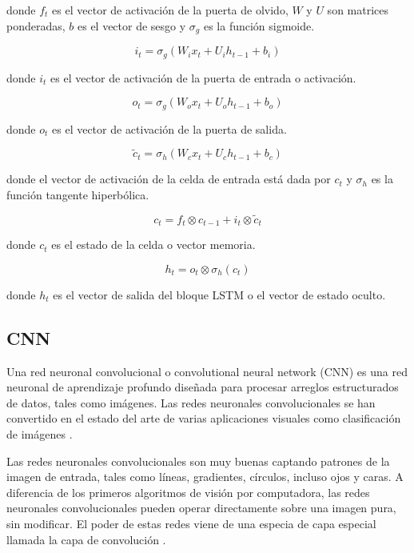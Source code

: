 donde $f_t$ es el vector de activación de la puerta de olvido, $W$ y $U$ son matrices ponderadas, $b$ es el vector de sesgo y $\sigma_{g}$ es la función sigmoide. 

\begin{equation}
	i_{t}=\sigma_{g}\left(W_{i} x_{t}+U_{i} h_{t-1}+b_{i}\right)
\end{equation}

donde $i_t$ es el vector de activación de la puerta de entrada o activación.

\begin{equation}
	o_{t}=\sigma_{g}\left(W_{o} x_{t}+U_{o} h_{t-1}+b_{o}\right)
\end{equation}

donde $o_t$ es el vector de activación de la puerta de salida.

\begin{equation}
	\tilde{c}_{t}=\sigma_{h}\left(W_{c} x_{t}+U_{c} h_{t-1}+b_{c}\right)
\end{equation}

donde el vector de activación de la celda de entrada está dada por $c_t$ y $\sigma_{h}$ es la función tangente hiperbólica.

\begin{equation}
	c_{t}=f_{t} \otimes c_{t-1}+i_{t} \otimes \tilde{c}_{t}
\end{equation}

donde $c_t$ es el estado de la celda o vector memoria.

\begin{equation}
	h_{t}=o_{t} \otimes \sigma_{h}\left(c_{t}\right)
	\label{LSTM2}
\end{equation}

donde $h_t$ es el vector de salida del bloque LSTM o el vector de estado oculto. 


\subsection{CNN}
Una red neuronal convolucional o convolutional neural network (CNN) es una red neuronal de aprendizaje profundo diseñada para procesar arreglos estructurados de datos, tales como imágenes. Las redes neuronales convolucionales se han convertido en el estado del arte de varias aplicaciones visuales como clasificación de imágenes \cite{ConvolutionalNeuralNetwork2019}.

Las redes neuronales convolucionales son muy buenas captando patrones de la imagen de entrada, tales como líneas, gradientes, círculos, incluso ojos y caras. A diferencia de los primeros algoritmos de visión por computadora, las redes neuronales convolucionales pueden operar directamente sobre una imagen pura, sin modificar. El poder de estas redes viene de una especia de capa especial llamada la capa de convolución \cite{ConvolutionalNeuralNetwork2019}.


